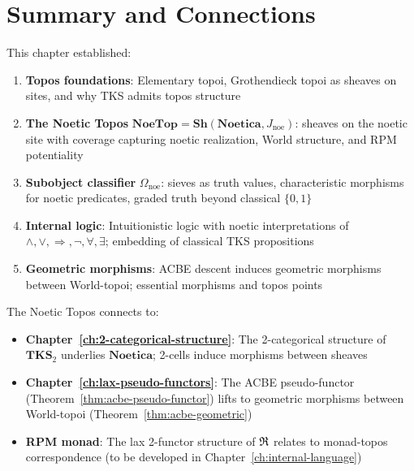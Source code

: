\section{Summary and Connections}
\label{sec:topos-summary}

\begin{remark}
This chapter established:
\begin{enumerate}
  \item \textbf{Topos foundations}: Elementary topoi, Grothendieck topoi as
        sheaves on sites, and why TKS admits topos structure
  \item \textbf{The Noetic Topos} $\mathbf{NoeTop} = \mathbf{Sh}(\mathbf{Noetica}, J_{\mathrm{noe}})$:
        sheaves on the noetic site with coverage capturing noetic realization,
        World structure, and RPM potentiality
  \item \textbf{Subobject classifier} $\Omega_{\mathrm{noe}}$: sieves as truth
        values, characteristic morphisms for noetic predicates, graded truth
        beyond classical $\{0, 1\}$
  \item \textbf{Internal logic}: Intuitionistic logic with noetic interpretations
        of $\land, \lor, \Rightarrow, \neg, \forall, \exists$; embedding of
        classical TKS propositions
  \item \textbf{Geometric morphisms}: ACBE descent induces geometric morphisms
        between World-topoi; essential morphisms and topos points
\end{enumerate}
\end{remark}

\begin{remark}
The Noetic Topos connects to:
\begin{itemize}
  \item \textbf{Chapter~\ref{ch:2-categorical-structure}}: The 2-categorical
        structure of $\mathbf{TKS}_2$ underlies $\mathbf{Noetica}$; 2-cells
        induce morphisms between sheaves
  \item \textbf{Chapter~\ref{ch:lax-pseudo-functors}}: The ACBE pseudo-functor
        (Theorem~\ref{thm:acbe-pseudo-functor}) lifts to geometric morphisms
        between World-topoi (Theorem~\ref{thm:acbe-geometric})
  \item \textbf{RPM monad}: The lax 2-functor structure of $\mathfrak{R}$ relates to
        monad-topos correspondence (to be developed in Chapter~\ref{ch:internal-language})
\end{itemize}
\end{remark}


